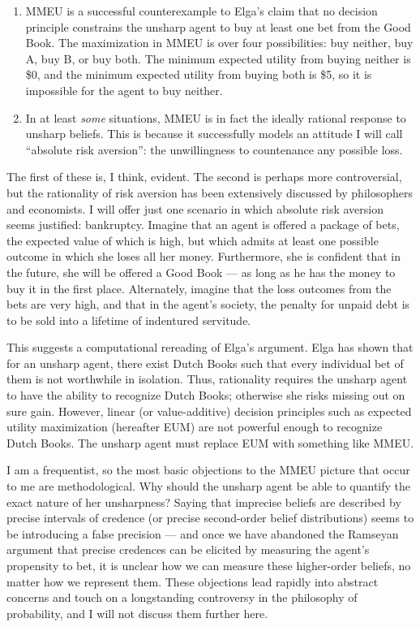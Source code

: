 \documentclass[letterpaper,12pt]{article}
\begin{document}
\begin{enumerate}
\item
MMEU is a successful counterexample to Elga's claim that no decision principle constrains the unsharp agent to buy at least one bet from the Good Book. The maximization in MMEU is over four possibilities: buy neither, buy A, buy B, or buy both. The minimum expected utility from buying neither is \$0, and the minimum expected utility from buying both is \$5, so it is impossible for the agent to buy neither.
\item
In at least \emph{some} situations, MMEU is in fact the ideally rational response to unsharp beliefs. This is because it successfully models an attitude I will call ``absolute risk aversion'': the unwillingness to countenance any possible loss.
\end{enumerate}

The first of these is, I think, evident. The second is perhaps more controversial, but the rationality of risk aversion has been extensively discussed by philosophers and economists. I will offer just one scenario in which absolute risk aversion seems justified: bankruptcy. Imagine that an agent is offered a package of bets, the expected value of which is high, but which admits at least one possible outcome in which she loses all her money. Furthermore, she is confident that in the future, she will be offered a Good Book --- as long as he has the money to buy it in the first place. Alternately, imagine that the loss outcomes from the bets are very high, and that in the agent's society, the penalty for unpaid debt is to be sold into a lifetime of indentured servitude.

This suggests a computational rereading of Elga's argument. Elga has shown that for an unsharp agent, there exist Dutch Books such that every individual bet of them is not worthwhile in isolation. Thus, rationality requires the unsharp agent to have the ability to recognize Dutch Books; otherwise she risks missing out on sure gain. However, linear (or value-additive) decision principles such as expected utility maximization (hereafter EUM) are not powerful enough to recognize Dutch Books. The unsharp agent must replace EUM with something like MMEU.

I am a frequentist, so the most basic objections to the MMEU picture that occur to me are methodological. Why should the unsharp agent be able to quantify the exact nature of her unsharpness? Saying that imprecise beliefs are described by precise intervals of credence (or precise second-order belief distributions) seems to be introducing a false precision --- and once we have abandoned the Ramseyan argument that precise credences can be elicited by measuring the agent's propensity to bet, it is unclear how we can measure these higher-order beliefs, no matter how we represent them. These objections lead rapidly into abstract concerns and touch on a longstanding controversy in the philosophy of probability, and I will not discuss them further here.
\end{document}
